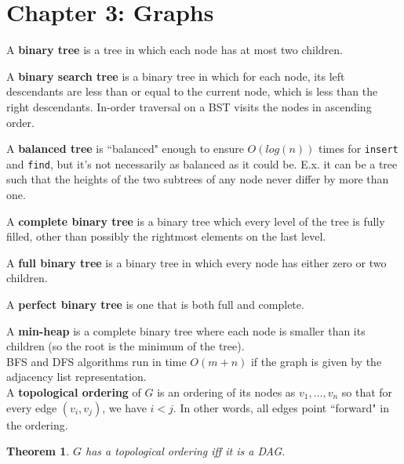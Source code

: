 \documentclass{report}
\newtheorem{Theorem}{Theorem}
\begin{document}
\section*{Chapter 3: Graphs}
A \textbf{binary tree} is a tree in which each node has at most two children.

A \textbf{binary search tree} is a binary tree in which for each node, its left descendants are less than or equal to the current node, which is less than the right descendants. In-order traversal on a BST visits the nodes in ascending order.

A \textbf{balanced tree} is ``balanced" enough to ensure $O(log(n))$ times for \texttt{insert} and \texttt{find}, but it's not necessarily as
balanced as it could be. E.x. it can be a tree such that the heights of the two subtrees of any node never differ by more than one.

A \textbf{complete binary tree} is a binary tree which every level of the tree is fully filled, other than possibly the rightmost elements on the last level.

A \textbf{full binary tree} is a binary tree in which every node has either zero or two children.

A \textbf{perfect binary tree} is one that is both full and complete.

A \textbf{min-heap} is a complete binary tree where each node is smaller than its children (so the root is the minimum of the tree).\\

BFS and DFS algorithms run in time $O(m + n)$ if the graph is given by the adjacency list representation.\\

A \textbf{topological ordering} of $G$ is an ordering of its nodes as $v_1,\ldots,v_n$ so that for every edge $(v_i,v_j)$, we have $i<j$. In other words, all edges point ``forward" in the ordering.

\begin{Theorem}
	$G$ has a topological ordering iff it is a DAG.
\end{Theorem}
\end{document}
